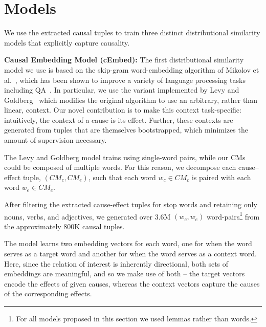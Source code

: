 \section{Models}
\label{sec:models}

We use the extracted causal tuples to train three distinct distributional similarity models that explicitly capture causality. 

{\flushleft \textbf{Causal Embedding Model (cEmbed):}}
The first distributional similarity model we use is based on the skip-gram word-embedding algorithm of Mikolov et al.~\citeyear{mikolov2013distributed}, which has been shown to improve a variety of language processing tasks %
including QA~\cite{yih13,fried2015higher}.  In particular, we use the variant implemented by Levy and Goldberg~\citeyear{levy2014dependency} which modifies the original algorithm to use an arbitrary, rather than linear, context. 
Our novel contribution is to make this context task-specific: intuitively, the context of a cause is its effect. Further, these contexts are generated from tuples that are themselves bootstrapped, which minimizes the amount of supervision necessary.

The Levy and Goldberg model trains using single-word pairs, while our CMs could be composed of multiple words.  
For this reason, we decompose each cause--effect tuple, $(CM_c,CM_e)$, such that each word $w_c \in CM_c$ is paired with each word $w_e \in CM_e$. 

After filtering the extracted cause-effect tuples for stop words and retaining only nouns, verbs, and adjectives, we generated over 3.6M $(w_c, w_e)$ word-pairs\footnote{For all models proposed in this section we used lemmas rather than words.} from the approximately 800K causal tuples.

The model learns two embedding vectors for each word, one for when the word serves as a target word and another for when the word serves as a context word.  Here, since the relation of interest is inherently directional, both sets of embeddings are meaningful, and so we make use of both -- the target vectors encode the effects of given causes, whereas the context vectors capture the causes of the corresponding effects. 


